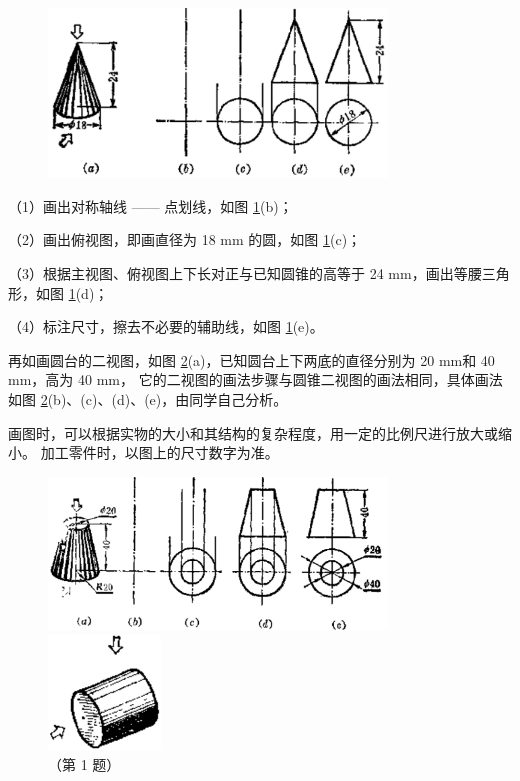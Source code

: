 \begin{figure}[htbp]
    \centering
    \includegraphics[width=9cm]{../pic/czjh2-ch8-10.png}
    \caption{}\label{fig:czjh2-8-10}
\end{figure}

（1）画出对称轴线 —— 点划线，如图 \ref{fig:czjh2-8-10}(b)；

（2）画出俯视图，即画直径为 18 mm 的圆，如图 \ref{fig:czjh2-8-10}(c)；

（3）根据主视图、俯视图上下长对正与已知圆锥的高等于 24 mm，画出等腰三角形，如图 \ref{fig:czjh2-8-10}(d)；

（4）标注尺寸，擦去不必要的辅助线，如图 \ref{fig:czjh2-8-10}(e)。

再如画圆台的二视图，如图 \ref{fig:czjh2-8-11}(a)，已知圆台上下两底的直径分别为 20 mm和 40 mm，高为 40 mm，
它的二视图的画法步骤与圆锥二视图的画法相同，具体画法如图 \ref{fig:czjh2-8-11}(b)、(c)、(d)、(e)，由同学自己分析。


画图时，可以根据实物的大小和其结构的复杂程度，用一定的比例尺进行放大或缩小。
加工零件时，以图上的尺寸数字为准。

\begin{figure}[htbp]
    \centering
    \begin{minipage}[b]{10cm}
        \centering
        \includegraphics[width=9cm]{../pic/czjh2-ch8-11.png}
        \caption{}\label{fig:czjh2-8-11}
    \end{minipage}
    \begin{minipage}[b]{4cm}
        \centering
        \includegraphics[width=3cm]{../pic/czjh2-ch8-subsec2-lx-01.png}
        \caption*{（第 1 题）}
    \end{minipage}
\end{figure}

